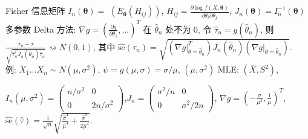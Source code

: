 \documentclass[a4paper, landscape,10pt]{article}
\begin{document}
\begin{multicols}{4}
Fisher 信息矩阵 $I_n(\mathbf{\theta}) = $ $(E_{\mathbf{\theta}}(H_{ij}))$,
$ H_{ij} = \frac{\partial \log f(X; \mathbf{\theta})}{\partial \theta_i \partial \theta_j}$,
$J_n(\mathbf{\theta}) = I_n^{-1}(\mathbf{\theta})$\\
多参数 Delta 方法: $\nabla g = (\frac{\partial g}{\partial \theta_1}, \dots)^T$ 在 $\hat \theta_n$ 处不为 $0$, 令 $\hat \tau_n = g(\hat \theta_n)$, 则
$\frac {\hat \tau_n - \tau} {\sqrt{\hat \tau_n^T J_n(\hat \theta_n) \hat \tau_n}} \rightsquigarrow N(0, 1)$,
其中 $\hat {\mathrm{se}}(\hat \tau_n) = \sqrt{(\nabla g |_{\theta = \hat \theta_n}^T) J_n(\hat \theta_n) (\nabla g |_{\theta = \hat \theta_n})}$. \\
例: $X_1\dots X_n \sim N(\mu, \sigma^2)$, $\psi = g(\mu, \sigma) = \sigma / \mu$,
$(\mu, \sigma ^ 2)$ MLE: $(\overline X, S^2)$,\begin{scriptsize}
$I_n(\mu, \sigma^2) = \begin{pmatrix}
	n / \sigma^2 & 0 \\
	0 & 2n / \sigma^2
\end{pmatrix}$,$J_n = \begin{pmatrix}
	\sigma^2 / n & 0 \\
	0 & \sigma^2 / 2n
\end{pmatrix}$, $\nabla g = (-\frac{\sigma}{\mu^2}, \frac{1}{\mu})^T$,
$\hat {\mathrm{se}}(\hat \tau) = \frac 1 {\sqrt n} \sqrt{\frac {\hat \sigma ^ 4} {\hat \mu^4} + \frac {\hat \sigma^2} {2 \hat \mu^2}}$.
\end{scriptsize} \\

\newcolumn


\end{multicols}
\end{document}
